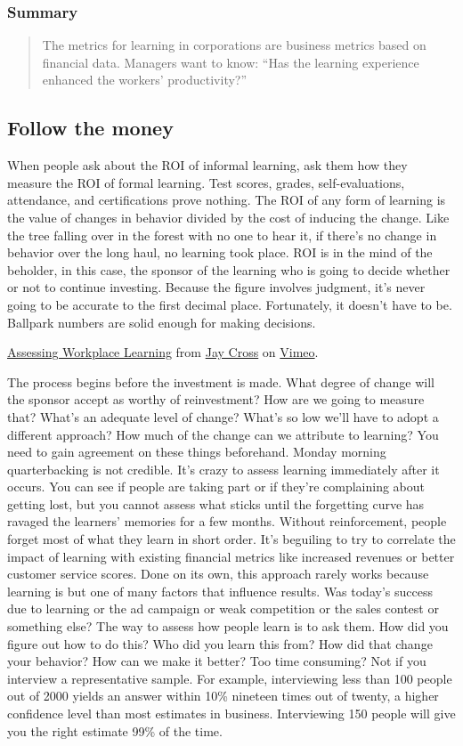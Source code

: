 \subsubsection{Summary}

\begin{quote}
The metrics for learning in corporations are business metrics based on
financial data. Managers want to know: ``Has the learning experience
enhanced the workers' productivity?''
\end{quote}

\subsection{Follow the money}

When people ask about the ROI of informal learning, ask them how they
measure the ROI of formal learning. Test scores, grades,
self-evaluations, attendance, and certifications prove nothing. The ROI
of any form of learning is the value of changes in behavior divided by
the cost of inducing the change. Like the tree falling over in the
forest with no one to hear it, if there's no change in behavior over the
long haul, no learning took place. ROI is in the mind of the beholder,
in this case, the sponsor of the learning who is going to decide whether
or not to continue investing. Because the figure involves judgment, it's
never going to be accurate to the first decimal place. Fortunately, it
doesn't have to be. Ballpark numbers are solid enough for making
decisions.

\href{http://vimeo.com/45989089}{Assessing Workplace Learning} from
\href{http://vimeo.com/user7021511}{Jay Cross} on
\href{http://vimeo.com}{Vimeo}.

The process begins before the investment is made. What degree of change
will the sponsor accept as worthy of reinvestment? How are we going to
measure that? What's an adequate level of change? What's so low we'll
have to adopt a different approach? How much of the change can we
attribute to learning? You need to gain agreement on these things
beforehand. Monday morning quarterbacking is not credible. It's crazy to
assess learning immediately after it occurs. You can see if people are
taking part or if they're complaining about getting lost, but you cannot
assess what sticks until the forgetting curve has ravaged the learners'
memories for a few months. Without reinforcement, people forget most of
what they learn in short order. It's beguiling to try to correlate the
impact of learning with existing financial metrics like increased
revenues or better customer service scores. Done on its own, this
approach rarely works because learning is but one of many factors that
influence results. Was today's success due to learning or the ad
campaign or weak competition or the sales contest or something else? The
way to assess how people learn is to ask them. How did you figure out
how to do this? Who did you learn this from? How did that change your
behavior? How can we make it better? Too time consuming? Not if you
interview a representative sample. For example, interviewing less than
100 people out of 2000 yields an answer within 10\% nineteen times out
of twenty, a higher confidence level than most estimates in business.
Interviewing 150 people will give you the right estimate 99\% of the
time.
